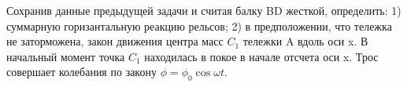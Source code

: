 Сохранив данные предыдущей задачи и считая балку BD жесткой, определить: 1) суммарную горизантальную реакцию рельсов; 2) в предположении, что тележка не заторможена, закон движения центра 
масс $C_{1}$ тележки A вдоль оси  x. 
В начальный момент точка $C_{1}$ находилась в покое в начале отсчета оси x. Трос совершает колебания по закону $\phi=\phi_{0}\cos \omega t$.